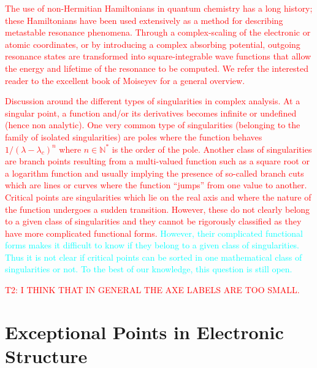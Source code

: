 \documentclass[aps,prb,reprint,noshowkeys,superscriptaddress]{revtex4-1}
\newcommand{\titou}[1]{\textcolor{red}{#1}}
\newcommand{\antoine}[1]{\textcolor{cyan}{#1}}
\begin{document}
\titou{The use of non-Hermitian Hamiltonians in quantum chemistry has a long history; these Hamiltonians have been used extensively as a method for describing metastable resonance phenomena. \cite{MoiseyevBook}
Through a complex-scaling of the electronic or atomic coordinates,\cite{Moiseyev_1998} or by introducing a complex absorbing potential,\cite{Riss_1993,Ernzerhof_2006,Benda_2018} outgoing resonance states are transformed into square-integrable wave functions that allow the energy and lifetime of the resonance to be computed.
We refer the interested reader to the excellent book of Moiseyev for a general overview. \cite{MoiseyevBook}}

\titou{Discussion around the different types of singularities in complex analysis.
At a singular point, a function and/or its derivatives becomes infinite or undefined (hence non analytic).
One very common type of singularities (belonging to the family of isolated singularities) are poles where the function behaves $1/(\lambda - \lambda_c)^n$ where $n \in \mathbb{N}^*$ is the order of the pole.
Another class of singularities are branch points resulting from a multi-valued function such as a square root or a logarithm function and usually implying the presence of so-called branch cuts which are lines or curves where the function ``jumps'' from one value to another.
Critical points are singularities which lie on the real axis and where the nature of the function undergoes a sudden transition. 
However, these do not clearly belong to a given class of singularities and they cannot be rigorously classified as they have more complicated functional forms.
}
\antoine{However, their complicated functional forms makes it difficult to know if they belong to a given class of singularities. Thus it is not clear if critical points can be sorted in one mathematical class of singularities or not. To the best of our knowledge, this question is still open.} 

\titou{T2: I THINK THAT IN GENERAL THE AXE LABELS ARE TOO SMALL.}

\section{Exceptional Points in Electronic Structure}
\label{sec:EPs}

\end{document}
